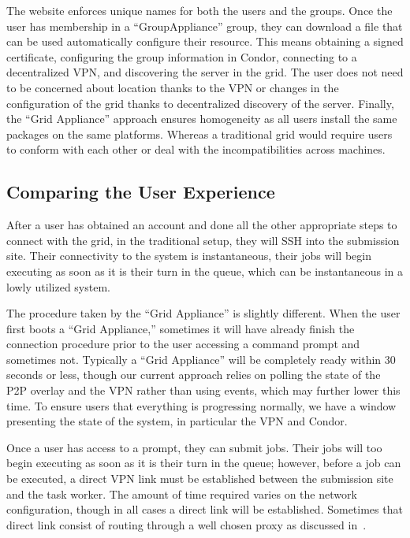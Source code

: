 \documentclass[conference]{IEEEtran}
\begin{document}
The website enforces unique names for both the users and the groups.  Once the
user has membership in a ``GroupAppliance'' group, they can download a file
that can be used automatically configure their resource.  This means obtaining
a signed certificate, configuring the group information in Condor, connecting
to a decentralized VPN, and discovering the server in the grid.  The user does
not need to be concerned about location thanks to the VPN or changes in the
configuration of the grid thanks to decentralized discovery of the server.
Finally, the ``Grid Appliance'' approach ensures homogeneity as all users
install the same packages on the same platforms.  Whereas a traditional grid
would require users to conform with each other or deal with the
incompatibilities across machines.

\subsection{Comparing the User Experience}

After a user has obtained an account and done all the other appropriate steps
to connect with the grid, in the traditional setup, they will SSH into the
submission site.  Their connectivity to the system is instantaneous, their jobs
will begin executing as soon as it is their turn in the queue, which can be
instantaneous in a lowly utilized system.

The procedure taken by the ``Grid Appliance'' is slightly different.  When the
user first boots a ``Grid Appliance,'' sometimes it will have already finish
the connection procedure prior to the user accessing a command prompt and
sometimes not.  Typically a ``Grid Appliance'' will be completely ready within
30 seconds or less, though our current approach relies on polling the state of
the P2P overlay and the VPN rather than using events, which may further lower
this time.  To ensure users that everything is progressing normally, we have a
window presenting the state of the system, in particular the VPN and Condor.

Once a user has access to a prompt, they can submit jobs.  Their jobs will too
begin executing as soon as it is their turn in the queue; however, before a job
can be executed, a direct VPN link must be established between the submission
site and the task worker.  The amount of time required varies on the network
configuration, though in all cases a direct link will be established.
Sometimes that direct link consist of routing through a well chosen proxy as
discussed in~\cite{groupvpn}.
\end{document}
